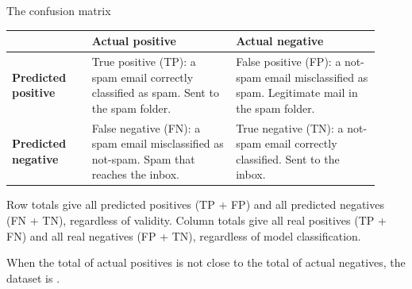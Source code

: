 \begin{frame}{The confusion matrix}
  \begin{withmargin}
    \begin{tdmain}
      \footnotesize
      \begin{tabular}{@{}p{0.20\linewidth}p{0.36\linewidth}p{0.36\linewidth}@{}}
        \toprule
         & \textbf{Actual positive} & \textbf{Actual negative}\\
        \midrule
        \textbf{Predicted positive}
          & True positive (TP): a spam email correctly classified as spam.
            Sent to the spam folder.
          & False positive (FP): a not-spam email misclassified as spam.
            Legitimate mail in the spam folder.\\[0.5em]
        \textbf{Predicted negative}
          & False negative (FN): a spam email misclassified as not-spam. Spam
            that reaches the inbox.
          & True negative (TN): a not-spam email correctly classified. Sent to
            the inbox.\\
        \bottomrule
      \end{tabular}
    \end{tdmain}
    \begin{tdmargin}
      Row totals give all predicted positives (TP + FP) and all predicted
      negatives (FN + TN), regardless of validity. Column totals give all real
      positives (TP + FN) and all real negatives (FP + TN), regardless of model
      classification.
      \par\medskip
      When the total of actual positives is not close to the total of actual
      negatives, the dataset is .
    \end{tdmargin}
  \end{withmargin}
\end{frame}

